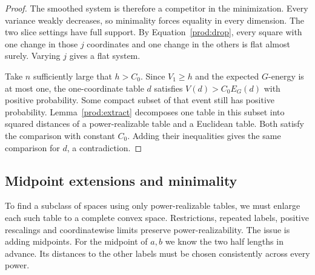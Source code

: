 \begin{proof}
The smoothed system is therefore a competitor in the minimization.
Every variance weakly decreases, so minimality forces equality in
every dimension. The two slice settings have full support. By
Equation~\eqref{prod:drop}, every square with one change in those $j$
coordinates and one change in the others is flat almost surely.
Varying $j$ gives a flat system.

Take $n$ sufficiently large that $h>C_0$. Since $V_1\ge h$ and
the expected $G$-energy is at most one, the one-coordinate table $d$
satisfies $V(d)>C_0E_G(d)$ with positive probability. Some compact
subset of that event still has positive probability.
Lemma~\ref{prod:extract} decomposes one table in this subset into
squared distances of a power-realizable table and a Euclidean table.
Both satisfy the comparison with constant $C_0$. Adding their
inequalities gives the same comparison for $d$, a contradiction.
\end{proof}

\subsection{Midpoint extensions and minimality}

To find a subclass of spaces using only power-realizable tables, we
must enlarge each such table to a complete convex space. Restrictions,
repeated labels, positive rescalings and coordinatewise limits preserve
power-realizability. The issue is adding midpoints. For the midpoint of
$a,b$ we know the two half lengths in advance. Its distances to the
other labels must be chosen consistently across every power.

